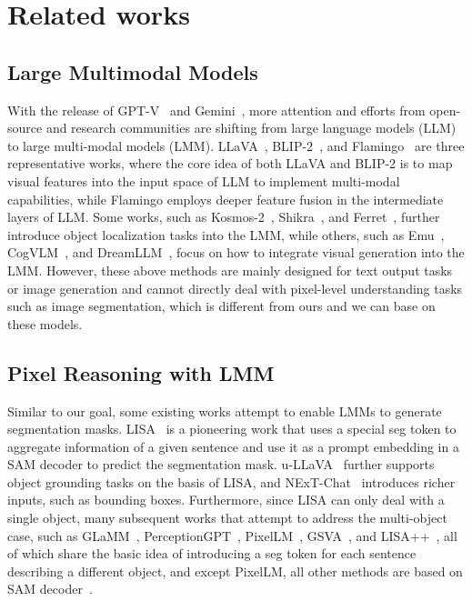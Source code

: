 \section{Related works}
\subsection{Large Multimodal Models}
With the release of GPT-V~\cite{GPT-V} and Gemini~\cite{Gemini}, more attention and efforts from open-source and research communities are shifting from large language models (LLM) to large multi-modal models (LMM). 
LLaVA~\cite{llava}, BLIP-2~\cite{blip2}, and Flamingo~\cite{flamingo} are three representative works, where the core idea of both LLaVA and BLIP-2 is to map visual features into the input space of LLM to implement multi-modal capabilities, while Flamingo employs deeper feature fusion in the intermediate layers of LLM. 
Some works, such as Kosmos-2~\cite{kosmos_2}, Shikra~\cite{chen2023shikra}, and Ferret~\cite{you2023ferret}, further introduce object localization tasks into the LMM, while others, such as Emu~\cite{emu}, CogVLM~\cite{wang2023cogvlm}, and DreamLLM~\cite{dong2023dreamllm}, focus on how to integrate visual generation into the LMM. 
However, these above methods are mainly designed for text output tasks or image generation and cannot directly deal with pixel-level understanding tasks such as image segmentation, which is different from ours and we can base on these models.
\subsection{Pixel Reasoning with LMM}
Similar to our goal, some existing works attempt to enable LMMs to generate segmentation masks. LISA~\cite{lisa} is a pioneering work that uses a special seg token to aggregate information of a given sentence and use it as a prompt embedding in a SAM decoder to predict the segmentation mask. u-LLaVA~\cite{ullava} further supports object grounding tasks on the basis of LISA, and NExT-Chat~\cite{nextchat} introduces richer inputs, such as bounding boxes. Furthermore, since LISA can only deal with a single object, many subsequent works that attempt to address the multi-object case, such as GLaMM~\cite{glamm}, PerceptionGPT~\cite{pi2023perceptiongpt}, PixelLM~\cite{pixellm}, GSVA~\cite{xia2023gsva}, and LISA++~\cite{lisa++}, all of which share the basic idea of introducing a seg token for each sentence describing a different object, and except PixelLM, all other methods are based on SAM decoder~\cite{sam}.

